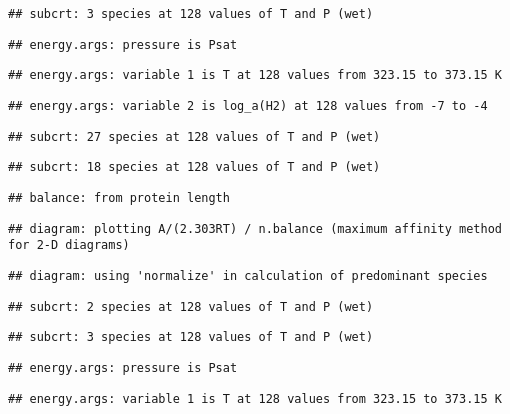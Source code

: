 \documentclass[]{article}
\begin{document}
\begin{verbatim}
## subcrt: 3 species at 128 values of T and P (wet)
\end{verbatim}

\begin{verbatim}
## energy.args: pressure is Psat
\end{verbatim}

\begin{verbatim}
## energy.args: variable 1 is T at 128 values from 323.15 to 373.15 K
\end{verbatim}

\begin{verbatim}
## energy.args: variable 2 is log_a(H2) at 128 values from -7 to -4
\end{verbatim}

\begin{verbatim}
## subcrt: 27 species at 128 values of T and P (wet)
\end{verbatim}

\begin{verbatim}
## subcrt: 18 species at 128 values of T and P (wet)
\end{verbatim}

\begin{verbatim}
## balance: from protein length
\end{verbatim}

\begin{verbatim}
## diagram: plotting A/(2.303RT) / n.balance (maximum affinity method for 2-D diagrams)
\end{verbatim}

\begin{verbatim}
## diagram: using 'normalize' in calculation of predominant species
\end{verbatim}

\begin{verbatim}
## subcrt: 2 species at 128 values of T and P (wet)
\end{verbatim}

\begin{verbatim}
## subcrt: 3 species at 128 values of T and P (wet)
\end{verbatim}

\begin{verbatim}
## energy.args: pressure is Psat
\end{verbatim}

\begin{verbatim}
## energy.args: variable 1 is T at 128 values from 323.15 to 373.15 K
\end{verbatim}
\end{document}
